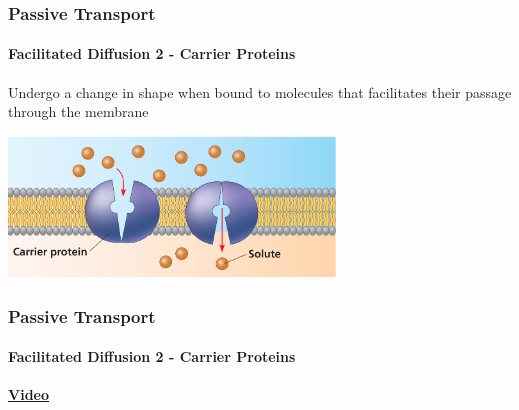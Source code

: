 \documentclass[10pt]{beamer}
\begin{document}
\begin{frame}[t]
\frametitle{Passive Transport}
\framesubtitle{Facilitated Diffusion 2 - Carrier Proteins}
\vspace{0.5cm}

	Undergo a change in shape when bound to molecules that facilitates their passage through the membrane

	\vspace{0.5cm}
	
	\begin{center}
		\includegraphics[width=0.65\textwidth]{figures/fg07_14b.jpg}
	\end{center}
\end{frame}


\begin{frame}
\frametitle{Passive Transport}
\framesubtitle{Facilitated Diffusion 2 - Carrier Proteins}
\vspace{0.5cm}

	\begin{center}
		\href{https://www.youtube.com/watch?v=IX-kLh34KcQ}{\LARGE{\textbf{Video}}}
	\end{center}

\end{frame}
\end{document}
